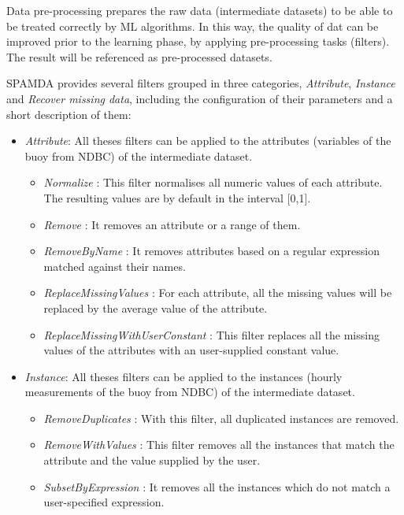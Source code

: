 \documentclass[review]{elsarticle}
\begin{document}
				Data pre-processing prepares the raw data (intermediate datasets) to be able to be treated correctly by ML algorithms. In this way, the quality of dat can be improved prior to the learning phase, by applying pre-processing tasks (filters). The result will be referenced as pre-processed datasets.
				
				SPAMDA provides several filters grouped in three categories, \textit{Attribute}, \textit{Instance} and \textit{Recover missing data}, including the configuration of their parameters and a short description of them:
				
				\begin{itemize}

				 \item \textit{Attribute}: All theses filters can be applied to the attributes (variables of the buoy from NDBC) of the intermediate dataset.
				 
					\begin{itemize}
						\item \textit{Normalize} \cite{WEKA_Filter_Normalize}: This filter normalises all numeric values of each attribute. The resulting values are by default in the interval [0,1].
						\item \textit{Remove} \cite{WEKA_Filter_Remove}: It removes an attribute or a range of them.
						\item \textit{RemoveByName} \cite{WEKA_Filter_RemoveByName}: It removes attributes based on a regular expression matched against their names.
						\item \textit{ReplaceMissingValues} \cite{WEKA_Filter_ReplaceMissingValues}: For each attribute, all the missing values will be replaced by the average value of the attribute.
						\item \textit{ReplaceMissingWithUserConstant} \cite{WEKA_Filter_ReplaceMissingWithUserConstant}: This filter replaces all the missing values of the attributes with an user-supplied constant value.
					\end{itemize}
				 
				 \item \textit{Instance}: All theses filters can be applied to the instances (hourly measurements of the buoy from NDBC) of the intermediate dataset.
					\begin{itemize}
						\item \textit{RemoveDuplicates} \cite{WEKA_Filter_RemoveDuplicates}: With this filter, all duplicated instances are removed.
						\item \textit{RemoveWithValues} \cite{WEKA_Filter_RemoveWithValues}: This filter removes all the instances that match the attribute and the value supplied by the user.
						\item \textit{SubsetByExpression} \cite{WEKA_Filter_SubsetByExpression}: It removes all the instances which do not match a user-specified expression.
					\end{itemize}
				 

\end{itemize}
\end{document}
